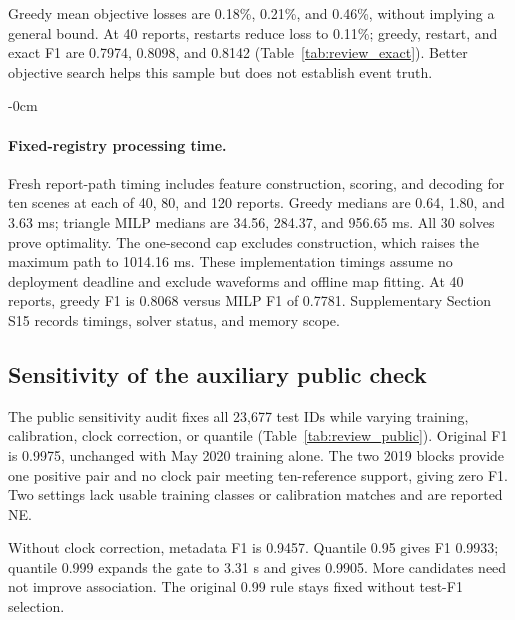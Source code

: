 Greedy mean objective losses are 0.18\%, 0.21\%, and 0.46\%, without implying a general bound. At 40 reports, restarts reduce loss to 0.11\%; greedy, restart, and exact F1 are 0.7974, 0.8098, and 0.8142 (Table~\ref{tab:review_exact}). Better objective search helps this sample but does not establish event truth.

\begin{table}[!t]\begin{adjustwidth}{-\extralength}{0cm}
\caption{Medium-size audit against proven optima. Times are medians in the review environment, including MILP construction. Every decoder is feasible; unproven incumbents are not labeled exact.}\label{tab:review_exact}
\small\setlength{\tabcolsep}{3pt}
\end{adjustwidth}\end{table}

\paragraph{Fixed-registry processing time.}
Fresh report-path timing includes feature construction, scoring, and decoding for ten scenes at each of 40, 80, and 120 reports. Greedy medians are 0.64, 1.80, and 3.63 ms; triangle MILP medians are 34.56, 284.37, and 956.65 ms. All 30 solves prove optimality. The one-second cap excludes construction, which raises the maximum path to 1014.16 ms. These implementation timings assume no deployment deadline and exclude waveforms and offline map fitting. At 40 reports, greedy F1 is 0.8068 versus MILP F1 of 0.7781. Supplementary Section S15 records timings, solver status, and memory scope.


\subsection{Sensitivity of the auxiliary public check}\label{sec:public_sensitivity}
The public sensitivity audit fixes all 23,677 test IDs while varying training, calibration, clock correction, or quantile (Table~\ref{tab:review_public}). Original F1 is 0.9975, unchanged with May 2020 training alone. The two 2019 blocks provide one positive pair and no clock pair meeting ten-reference support, giving zero F1. Two settings lack usable training classes or calibration matches and are reported NE.

Without clock correction, metadata F1 is 0.9457. Quantile 0.95 gives F1 0.9933; quantile 0.999 expands the gate to 3.31 s and gives 0.9905. More candidates need not improve association. The original 0.99 rule stays fixed without test-F1 selection.

